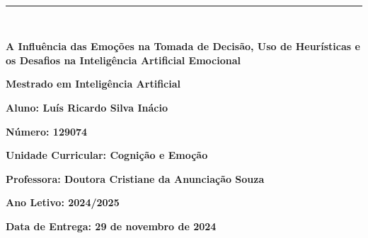 \documentclass[a4paper,12pt]{report}
\begin{document}
	
\begin{titlepage}
	\centering
	\vspace*{-2cm} %
	
	\hfill%
	\\[0.5cm]
	
	\noindent
	{\color{barraazul}\rule{\textwidth}{1mm}} %
	\\[1cm]
	
	{\LARGE  \textbf{A Influência das Emoções na Tomada de Decisão, Uso de Heurísticas e os Desafios na Inteligência Artificial Emocional} \par}
	\vspace{1.5cm}
	
	{\Large \textbf{Mestrado em Inteligência Artificial}} \par
	\vspace{1cm}
	
	{\large \textbf{Aluno: Luís Ricardo Silva Inácio}} \par
	{\large \textbf{Número: 129074}} \par
	\vspace{1cm}
	
	{\large \textbf{Unidade Curricular: Cognição e Emoção}} \par
	\vspace{1cm}
	
	{\large \textbf{Professora: Doutora Cristiane da Anunciação Souza}} \par
	\vfill
	
	{\large \textbf{Ano Letivo: 2024/2025}} \par
	\vspace{0.5cm}
	{\large \textbf{Data de Entrega: 29 de novembro de 2024}} \par
\end{titlepage}
\end{document}
